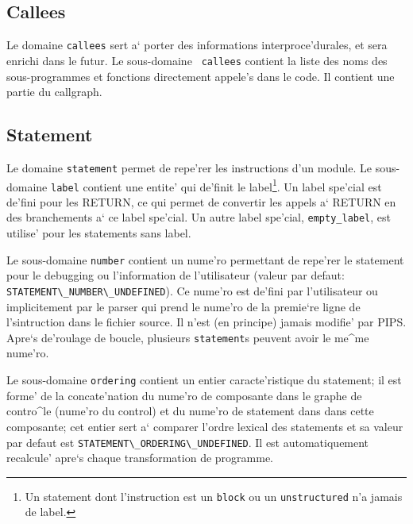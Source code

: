 \subsection{Callees}
\label{subsection-callees}


{ Le domaine {\tt callees} sert a` porter des informations
interproce'durales, et sera enrichi dans le futur.  Le sous-domaine {\tt
callees} contient la liste des noms des sous-programmes et fonctions
directement appele's dans le code. Il contient une partie du callgraph.
}

\subsection{Statement}
\label{subsection-statement}

{}

Le domaine \verb/statement/ permet de
repe'rer les instructions d'un module.  Le sous-domaine \verb/label/
contient une entite' qui de'finit le label\footnote{Un statement dont
l'instruction est un \verb/block/ ou un \verb/unstructured/ n'a jamais
de label.}. Un label spe'cial est de'fini pour les RETURN, ce qui permet
de convertir les appels a` RETURN en des branchements a` ce label
spe'cial. Un autre label spe'cial, \verb/empty_label/, est utilise' pour
les statements sans label.

Le sous-domaine \verb/number/ contient un nume'ro permettant de repe'rer
le statement pour le debugging ou l'information de l'utilisateur (valeur
par defaut: \verb+STATEMENT\_NUMBER\_UNDEFINED+). Ce nume'ro est de'fini
par l'utilisateur ou implicitement par le parser qui prend le nume'ro de
la premie`re ligne de l'sintruction dans le fichier source. Il n'est (en
principe) jamais modifie' par PIPS. Apre`s de'roulage de boucle,
plusieurs \verb/statement/s peuvent avoir le me^me nume'ro.

Le sous-domaine \verb/ordering/ contient un entier caracte'ristique du
statement; il est forme' de la concate'nation du nume'ro de composante
dans le graphe de contro^le (nume'ro du control) et du nume'ro de
statement dans dans cette composante; cet entier sert a` comparer
l'ordre lexical des statements et sa valeur par defaut est
\verb+STATEMENT\_ORDERING\_UNDEFINED+. Il est automatiquement recalcule'
apre`s chaque transformation de programme. 

